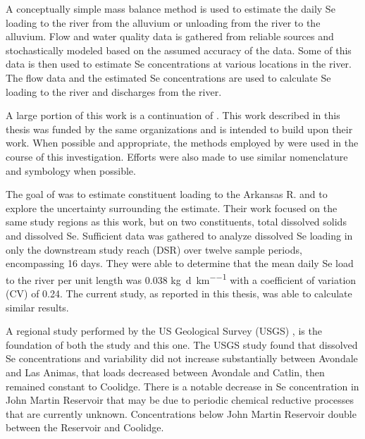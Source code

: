 A conceptually simple mass balance method is used to estimate the daily Se loading to the river from the alluvium or unloading from the river to the alluvium.  Flow and water quality data is gathered from reliable sources and stochastically modeled based on the assumed accuracy of the data.  Some of this data is then used to estimate Se concentrations at various locations in the river.  The flow data and the estimated Se concentrations are used to calculate Se loading to the river and discharges from the river.

A large portion of this work is a continuation of \citet{Mueller2008}.  This work described in this thesis was funded by the same organizations and is intended to build upon their work.  When possible and appropriate, the methods employed by \citeauthor{Mueller2008} were used in the course of this investigation.  Efforts were also made to use similar nomenclature and symbology when possible.

The goal of \citeauthor{Mueller2008} was to estimate constituent loading to the Arkansas R. and to explore the uncertainty surrounding the estimate.  Their work focused on the same study regions as this work, but on two constituents, total dissolved solids and dissolved Se.  Sufficient data was gathered to analyze dissolved Se loading in only the downstream study reach (DSR) over twelve sample periods, encompassing 16 days.  They were able to determine that the mean daily Se load to the river per unit length was 0.038 \si{\kilo\gram\per\day\per\kilo\meter} with a coefficient of variation (CV) of 0.24.  The current study, as reported in this thesis, was able to calculate similar results.

A regional study performed by the US Geological Survey (USGS) \citep{Miller2010}, is the foundation of both the \citeauthor{Mueller2008} study and this one.  The USGS study found that dissolved Se concentrations and variability did not increase substantially between Avondale and Las Animas, that loads decreased between Avondale and Catlin, then remained constant to Coolidge.  There is a notable decrease in Se concentration in John Martin Reservoir that may be due to periodic chemical reductive processes that are currently unknown.  Concentrations below John Martin Reservoir double between the Reservoir and Coolidge.

